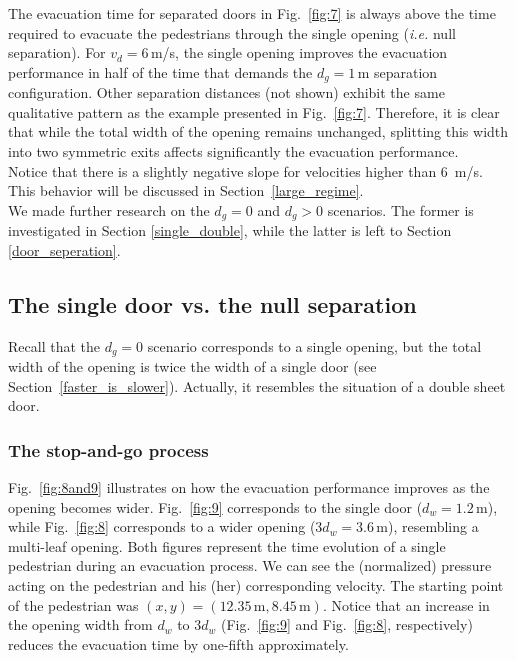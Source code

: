The evacuation time for separated doors in Fig.~\ref{fig:7} is always above the 
time required to evacuate the pedestrians through the single opening 
(\emph{i.e.} null separation). For $v_d=6\,$m/s, the single opening improves 
the evacuation performance in half of the time that demands the $d_g=1\,$m 
separation configuration. Other separation distances (not shown) exhibit the 
same qualitative pattern as the example presented in Fig.~\ref{fig:7}. 
Therefore, it is clear that while the total width of the opening 
remains unchanged, splitting this width into two symmetric exits affects 
significantly the evacuation performance. \\

Notice that there is a slightly negative slope for velocities higher than 6~m/s. This behavior will be discussed in Section~\ref{large_regime}. \\

We made further research on the $d_g=0$ and $d_g>0$ scenarios. The 
former is investigated in Section \ref{single_double}, while the latter is left 
to Section \ref{door_seperation}. \\

\subsection{\label{single_double}The single door vs. the null separation}

Recall that the $d_g=0$ scenario corresponds to a single opening, but the total 
width of the opening is twice the width of a single door (see 
Section~\ref{faster_is_slower}). Actually, it resembles the situation of a 
double sheet door.  \\

\subsubsection{\label{null_gap_data}The stop-and-go process}

Fig.~\ref{fig:8and9} illustrates on how the evacuation performance improves as 
the opening becomes wider.  Fig.~\ref{fig:9} corresponds to the single door 
($d_w=1.2\,$m), while  Fig.~\ref{fig:8} corresponds to a wider opening 
($3d_w=3.6\,$m), resembling a multi-leaf opening. Both figures represent 
the time evolution of a single pedestrian during an evacuation process. We can 
see the (normalized) pressure acting on the pedestrian and his (her) 
corresponding velocity. The starting point of the pedestrian was 
$(x,y)=(12.35\,\mathrm{m},8.45\,\mathrm{m})$. Notice that an increase in the 
opening width from $d_w$ to $3d_w$ (Fig.~\ref{fig:9} and Fig.~\ref{fig:8}, 
respectively) reduces the evacuation time by one-fifth approximately. \\

